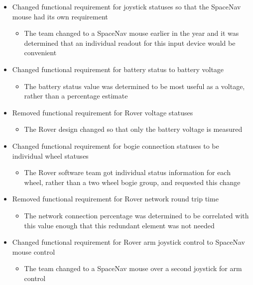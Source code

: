 \begin{itemize}
\item Changed functional requirement for joystick statuses so that the SpaceNav mouse had its own requirement
	\begin{itemize}
	\item The team changed to a SpaceNav mouse earlier in the year and it was determined that an individual readout for this input device would be convenient
	\end{itemize}
    
\item Changed functional requirement for battery status to battery voltage
	\begin{itemize}
	\item The battery status value was determined to be most useful as a voltage, rather than a percentage estimate
	\end{itemize}
    
\item Removed functional requirement for Rover voltage statuses
	\begin{itemize}
	\item The Rover design changed so that only the battery voltage is measured
	\end{itemize}
    
\item Changed functional requirement for bogie connection statuses to be individual wheel statuses
	\begin{itemize}
	\item The Rover software team got individual status information for each wheel, rather than a two wheel bogie group, and requested this change
	\end{itemize}
    
\item Removed functional requirement for Rover network round trip time
	\begin{itemize}
	\item The network connection percentage was determined to be correlated with this value enough that this redundant element was not needed
	\end{itemize}
    
\item Changed functional requirement for Rover arm joystick control to SpaceNav mouse control
	\begin{itemize}
	\item The team changed to a SpaceNav mouse over a second joystick for arm control
	\end{itemize}
    

\end{itemize}
